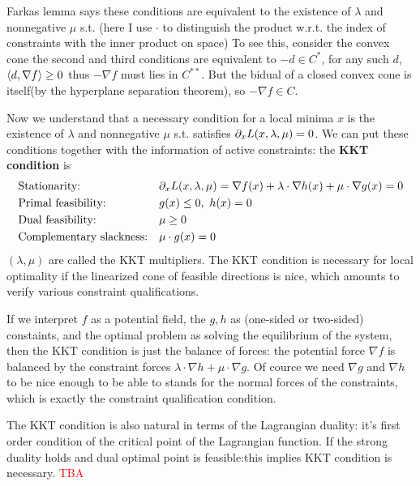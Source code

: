\documentclass[a4paper]{mynotes}
\def\redd#1{\textcolor{red}{#1}}
\begin{document}
Farkas lemma says these conditions are equivalent to the existence of $\lambda$ and nonnegative $\mu$ s.t. (here I use $\cdot$ to distinguish the product w.r.t. the index of constraints with the inner product on space)
To see this, consider the convex cone the second and third conditions are equivalent to $-d\in C^*$, for any such $d$, $\left\langle d,\nabla f\right\rangle\ge 0$  thus $-\nabla f$ must lies in $C^{**}$. But the bidual of a closed convex cone is itself(by the hyperplane separation theorem), so $-\nabla f\in C$.

Now we understand that a necessary condition for a local minima $x$ is the existence of $\lambda$ and nonnegative $\mu$ s.t.  satisfies $\partial_x L(x,\lambda,\mu)=0$. We can put these conditions together with the information of active constraints:
the \textbf{KKT condition} is
\[
\begin{aligned}
&\text{Stationarity:} &&\partial_x L(x,\lambda,\mu) =\nabla f(x)+\lambda\cdot\nabla h(x)+\mu\cdot \nabla g(x)=0\\
&\text{Primal feasibility:} && g(x)\le 0,\ h(x)=0\\
&\text{Dual feasibility:} && \mu\ge 0\\
&\text{Complementary slackness:} && \mu\cdot g(x)=0
\end{aligned}
\]
$(\lambda,\mu)$ are called the KKT multipliers. The KKT condition is necessary for local optimality if the linearized cone of feasible directions is nice, which amounts to verify various constraint qualifications.

If we interpret $f$ as a potential field, the $g,h$ as (one-sided or two-sided) constaints, and the optimal problem as solving the equilibrium of the system, then the KKT condition is just the balance of forces: the potential force $\nabla f$ is balanced by the constraint forces $\lambda\cdot\nabla h+\mu\cdot \nabla g$. Of cource we need $\nabla g$ and $\nabla h$ to be nice enough to be able to stands for the normal forces of the constraints, which is exactly the constraint qualification condition. 

The KKT condition is also natural in terms of the Lagrangian duality: it's  first order condition of the
critical point of the Lagrangian function.
If the strong duality holds and dual optimal point is feasible:this implies KKT condition is necessary. \redd{TBA}
\end{document}
